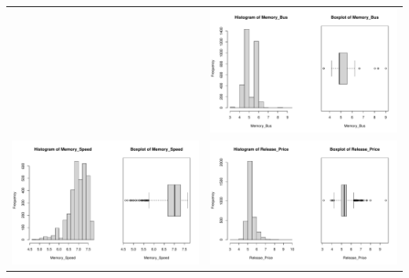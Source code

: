 \documentclass[a4paper]{article}
\theoremstyle{definition}
\begin{document}
\begin{center}
\begin{adjustbox}{width=\textwidth}
\begin{tabular}{cc}
        &\includegraphics[keepaspectratio, width=1\textwidth, height=1\textheight]{Visualization/Rplot_16.pdf}\\
        \includegraphics[keepaspectratio, width=1\textwidth, height=1\textheight]{Visualization/Rplot_17.pdf}
        &\includegraphics[keepaspectratio, width=1\textwidth, height=1\textheight]{Visualization/Rplot_18.pdf}\\
    \end{tabular}
\end{adjustbox}
\end{center}
\end{document}
